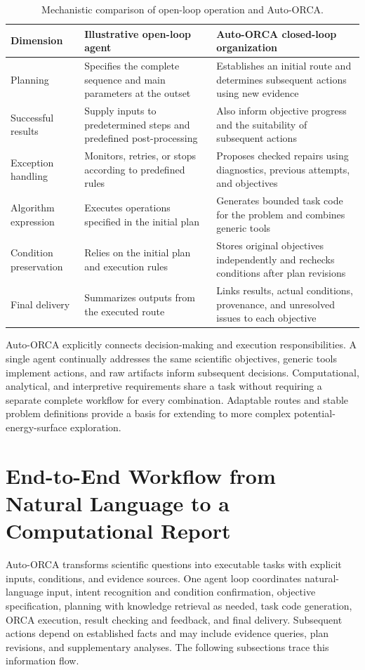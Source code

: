 \begin{table}[htbp]
  \centering\small
  \caption{Mechanistic comparison of open-loop operation and Auto-ORCA.}
  \label{tab:loop-comparison}
  \begin{tabularx}{\linewidth}{>{\raggedright\arraybackslash}p{2.35cm}YY}
    \toprule
    Dimension & Illustrative open-loop agent & Auto-ORCA closed-loop organization\\
    \midrule
    Planning & Specifies the complete sequence and main parameters at the outset & Establishes an initial route and determines subsequent actions using new evidence\\
    Successful results & Supply inputs to predetermined steps and predefined post-processing & Also inform objective progress and the suitability of subsequent actions\\
    Exception handling & Monitors, retries, or stops according to predefined rules & Proposes checked repairs using diagnostics, previous attempts, and objectives\\
    Algorithm expression & Executes operations specified in the initial plan & Generates bounded task code for the problem and combines generic tools\\
    Condition preservation & Relies on the initial plan and execution rules & Stores original objectives independently and rechecks conditions after plan revisions\\
    Final delivery & Summarizes outputs from the executed route & Links results, actual conditions, provenance, and unresolved issues to each objective\\
    \bottomrule
  \end{tabularx}
\end{table}

Auto-ORCA explicitly connects decision-making and execution responsibilities.
A single agent continually addresses the same scientific objectives, generic tools implement actions, and raw artifacts inform subsequent decisions.
Computational, analytical, and interpretive requirements share a task without requiring a separate complete workflow for every combination.
Adaptable routes and stable problem definitions provide a basis for extending to more complex potential-energy-surface exploration.

\section{End-to-End Workflow from Natural Language to a Computational Report}
\label{sec:end-to-end-workflow}
Auto-ORCA transforms scientific questions into executable tasks with explicit inputs, conditions, and evidence sources.
One agent loop coordinates natural-language input, intent recognition and condition confirmation, objective specification, planning with knowledge retrieval as needed, task code generation, ORCA execution, result checking and feedback, and final delivery.
Subsequent actions depend on established facts and may include evidence queries, plan revisions, and supplementary analyses.
The following subsections trace this information flow.

